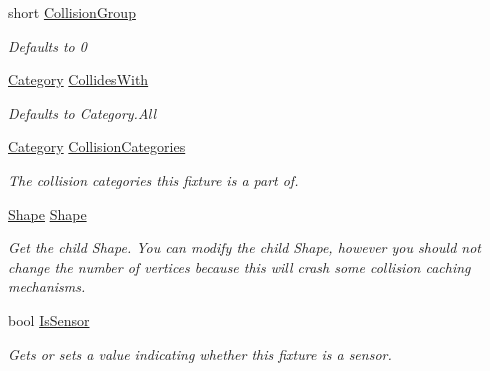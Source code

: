 \begin{DoxyCompactItemize}
\item 
short \hyperlink{class_farseer_physics_1_1_dynamics_1_1_fixture_a693bdde88d589d83e26586bdce516045}{Collision\+Group}
\begin{DoxyCompactList}\small\item\em Defaults to 0 \end{DoxyCompactList}\item 
\hyperlink{namespace_farseer_physics_1_1_dynamics_a411fb391cb862402e877a2d3d4e11bef}{Category} \hyperlink{class_farseer_physics_1_1_dynamics_1_1_fixture_a77d1606d127b819b88bc0c4866763cea}{Collides\+With}
\begin{DoxyCompactList}\small\item\em Defaults to Category.\+All \end{DoxyCompactList}\item 
\hyperlink{namespace_farseer_physics_1_1_dynamics_a411fb391cb862402e877a2d3d4e11bef}{Category} \hyperlink{class_farseer_physics_1_1_dynamics_1_1_fixture_ad8cb71ed3a90a2ddd9051fe6a293a226}{Collision\+Categories}
\begin{DoxyCompactList}\small\item\em The collision categories this fixture is a part of. \end{DoxyCompactList}\item 
\hyperlink{class_farseer_physics_1_1_collision_1_1_shapes_1_1_shape}{Shape} \hyperlink{class_farseer_physics_1_1_dynamics_1_1_fixture_a239b0bdb90528f2d0ca84eedaa10b76d}{Shape}
\begin{DoxyCompactList}\small\item\em Get the child Shape. You can modify the child Shape, however you should not change the number of vertices because this will crash some collision caching mechanisms. \end{DoxyCompactList}\item 
bool \hyperlink{class_farseer_physics_1_1_dynamics_1_1_fixture_a0b2dd53a07ff30b9f550ded721c9efe0}{Is\+Sensor}
\begin{DoxyCompactList}\small\item\em Gets or sets a value indicating whether this fixture is a sensor. \end{DoxyCompactList}\item 

\end{DoxyCompactItemize}
